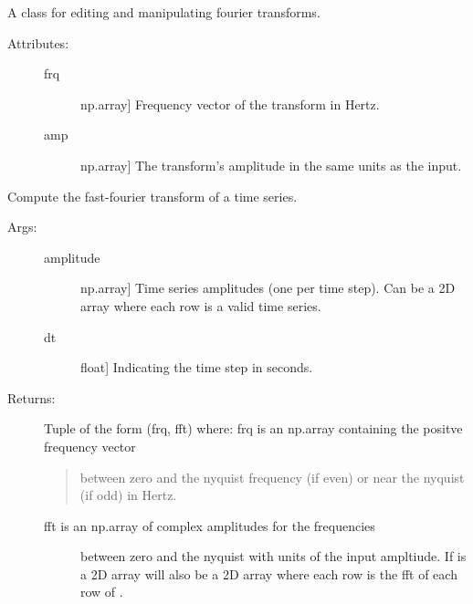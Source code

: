 \documentclass[letterpaper,10pt,english]{sphinxmanual}
\begin{document}
\begin{fulllineitems}
A class for editing and manipulating fourier transforms.
\begin{description}
\item[{Attributes:}] \leavevmode\begin{description}
\item[{frq}] \leavevmode{[}np.array{]}
Frequency vector of the transform in Hertz.

\item[{amp}] \leavevmode{[}np.array{]}
The transform’s amplitude in the same units as the input.

\end{description}

\end{description}


\begin{fulllineitems}
Compute the fast-fourier transform of a time series.
\begin{description}
\item[{Args:}] \leavevmode\begin{description}
\item[{amplitude}] \leavevmode{[}np.array{]}
Time series amplitudes (one per time step). Can be a 2D
array where each row is a valid time series.

\item[{dt}] \leavevmode{[}float{]}
Indicating the time step in seconds.

\end{description}

\item[{Returns:}] \leavevmode
Tuple of the form (frq, fft) where:
frq is an np.array containing the positve frequency vector
\begin{quote}

between zero and the nyquist frequency (if even) or near
the nyquist (if odd) in Hertz.
\end{quote}
\begin{description}
\item[{fft is an np.array of complex amplitudes for the frequencies}] \leavevmode
between zero and the nyquist with units of the input 
ampltiude. If  is a 2D array  will also 
be a 2D array where each row is the fft of each row of
.


\end{description}
\end{description}
\end{fulllineitems}
\end{fulllineitems}
\end{document}
